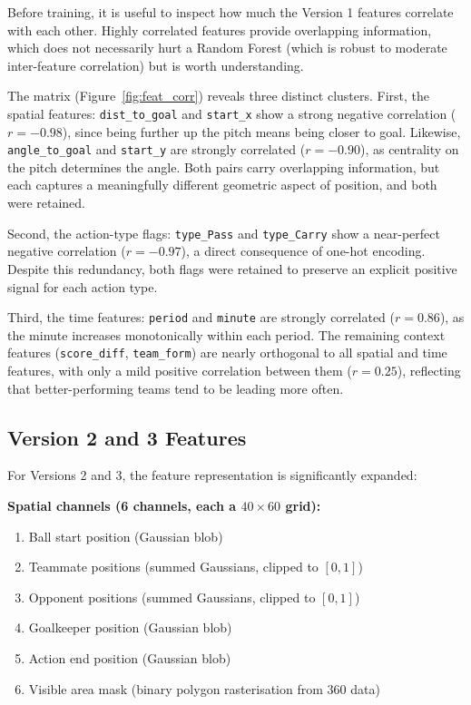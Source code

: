 Before training, it is useful to inspect how much the Version 1 features correlate with each other. Highly correlated features provide overlapping information, which does not necessarily hurt a Random Forest (which is robust to moderate inter-feature correlation) but is worth understanding.


The matrix (Figure~\ref{fig:feat_corr}) reveals three distinct clusters. First, the spatial features: \texttt{dist\_to\_goal} and \texttt{start\_x} show a strong negative correlation ($r = -0.98$), since being further up the pitch means being closer to goal. Likewise, \texttt{angle\_to\_goal} and \texttt{start\_y} are strongly correlated ($r = -0.90$), as centrality on the pitch determines the angle. Both pairs carry overlapping information, but each captures a meaningfully different geometric aspect of position, and both were retained.

Second, the action-type flags: \texttt{type\_Pass} and \texttt{type\_Carry} show a near-perfect negative correlation ($r = -0.97$), a direct consequence of one-hot encoding. Despite this redundancy, both flags were retained to preserve an explicit positive signal for each action type.

Third, the time features: \texttt{period} and \texttt{minute} are strongly correlated ($r = 0.86$), as the minute increases monotonically within each period. The remaining context features (\texttt{score\_diff}, \texttt{team\_form}) are nearly orthogonal to all spatial and time features, with only a mild positive correlation between them ($r = 0.25$), reflecting that better-performing teams tend to be leading more often.


\subsection{Version 2 and 3 Features}

For Versions 2 and 3, the feature representation is significantly expanded:

\textbf{Spatial channels (6 channels, each a $40\times60$ grid):}
\begin{enumerate}
    \item Ball start position (Gaussian blob)
    \item Teammate positions (summed Gaussians, clipped to $[0,1]$)
    \item Opponent positions (summed Gaussians, clipped to $[0,1]$)
    \item Goalkeeper position (Gaussian blob)
    \item Action end position (Gaussian blob)
    \item Visible area mask (binary polygon rasterisation from 360 data)
\end{enumerate}


